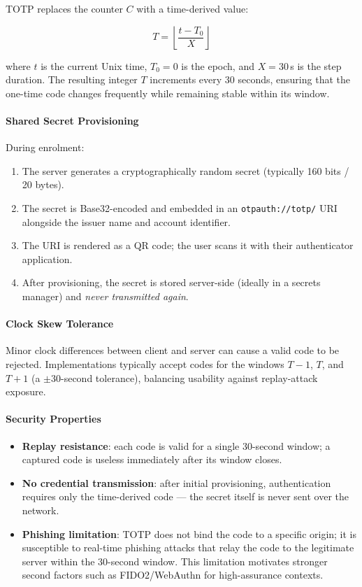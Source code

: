 TOTP replaces the counter $C$ with a time-derived value:

\[
T = \left\lfloor \frac{t - T_0}{X} \right\rfloor
\]

where $t$ is the current Unix time, $T_0 = 0$ is the epoch, and $X = 30$\,s is the step duration. The resulting integer $T$ increments every 30 seconds, ensuring that the one-time code changes frequently while remaining stable within its window.

\paragraph{Shared Secret Provisioning}

During enrolment:
\begin{enumerate}
    \item The server generates a cryptographically random secret (typically 160 bits / 20 bytes).
    \item The secret is Base32-encoded and embedded in an \texttt{otpauth://totp/} URI alongside the issuer name and account identifier.
    \item The URI is rendered as a QR code; the user scans it with their authenticator application.
    \item After provisioning, the secret is stored server-side (ideally in a secrets manager) and \emph{never transmitted again}.
\end{enumerate}

\paragraph{Clock Skew Tolerance}

Minor clock differences between client and server can cause a valid code to be rejected. Implementations typically accept codes for the windows $T-1$, $T$, and $T+1$ (a $\pm$30-second tolerance), balancing usability against replay-attack exposure.

\paragraph{Security Properties}

\begin{itemize}
    \item \textbf{Replay resistance}: each code is valid for a single 30-second window; a captured code is useless immediately after its window closes.
    \item \textbf{No credential transmission}: after initial provisioning, authentication requires only the time-derived code — the secret itself is never sent over the network.
    \item \textbf{Phishing limitation}: TOTP does not bind the code to a specific origin; it is susceptible to real-time phishing attacks that relay the code to the legitimate server within the 30-second window. This limitation motivates stronger second factors such as FIDO2/WebAuthn for high-assurance contexts.
\end{itemize}

